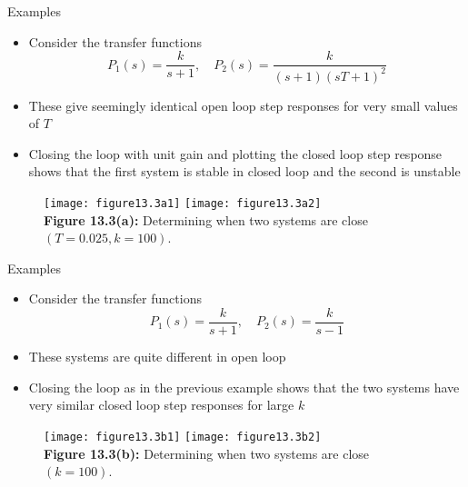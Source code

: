 \documentclass{beamer-control}
\begin{document}
\begin{frame}{Examples}
\begin{itemize}
	\item Consider the transfer functions 
	\[P_1(s)=\frac{k}{s+1},\quad P_2(s)=\frac{k}{(s+1)(sT+1)^2} \] 
	\item These give seemingly identical open loop step responses for very small values of $T$
	\item Closing the loop with unit gain and plotting the closed loop step response shows that the first system is stable in closed loop and the second is unstable
	
\end{itemize}
\begin{figure}
	\centering
	\texttt{[image: figure13.3a1]} \texttt{[image: figure13.3a2]} \\
	\vspace{-0.2cm}
	\textbf{Figure 13.3(a):} Determining when two systems are close $(T=0.025, k=100)$.
\end{figure}
\end{frame}


\begin{frame}{Examples}
	\begin{itemize}
		\item Consider the transfer functions 
		\[P_1(s)=\frac{k}{s+1},\quad P_2(s)=\frac{k}{s-1} \] 
		\item These systems are quite different in open loop
		\item Closing the loop as in the previous example shows that the two systems have very similar closed loop step responses for large $k$
		
	\end{itemize}
	\begin{figure}
		\centering
		\texttt{[image: figure13.3b1]} \texttt{[image: figure13.3b2]} \\
		\vspace{-0.2cm}
		\textbf{Figure 13.3(b):} Determining when two systems are close $(k=100)$.
	\end{figure}
\end{frame}





\SUMMARYFRAME
\FINALE
\end{document}
